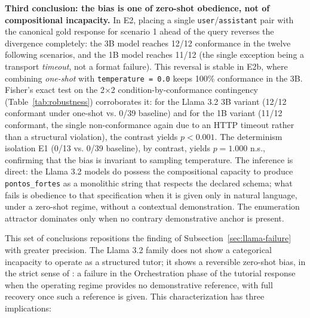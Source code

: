 \documentclass{sbc2023}%
\begin{document}
\textbf{Third conclusion: the bias is one of zero-shot obedience, not of compositional incapacity.} In E2, placing a single \texttt{user}/\texttt{assistant} pair with the canonical gold response for scenario 1 ahead of the query reverses the divergence completely: the 3B model reaches 12/12 conformance in the twelve following scenarios, and the 1B model reaches 11/12 (the single exception being a transport \textit{timeout}, not a format failure). This reversal is stable in E2b, where combining \textit{one-shot} with \texttt{temperature = 0.0} keeps 100\% conformance in the 3B. Fisher's exact test on the 2$\times$2 condition-by-conformance contingency (Table~\ref{tab:robustness}) corroborates it: for the Llama 3.2 3B variant (12/12 conformant under one-shot vs. 0/39 baseline) and for the 1B variant (11/12 conformant, the single non-conformance again due to an HTTP timeout rather than a structural violation), the contrast yields $p<0.001$. The determinism isolation E1 (0/13 vs. 0/39 baseline), by contrast, yields $p=1.000$ n.s., confirming that the bias is invariant to sampling temperature. The inference is direct: the Llama 3.2 models do possess the compositional capacity to produce \texttt{pontos\_fortes} as a monolithic string that respects the declared schema; what fails is obedience to that specification when it is given only in natural language, under a zero-shot regime, without a contextual demonstration. The enumeration attractor dominates only when no contrary demonstrative anchor is present.

This set of conclusions repositions the finding of Subsection~\ref{sec:llama-failure} with greater precision. The Llama 3.2 family does not show a categorical incapacity to operate as a structured tutor; it shows a reversible zero-shot bias, in the strict sense of \citet{liu2025socratic}: a failure in the Orchestration phase of the tutorial response when the operating regime provides no demonstrative reference, with full recovery once such a reference is given. This characterization has three implications:
\end{document}
